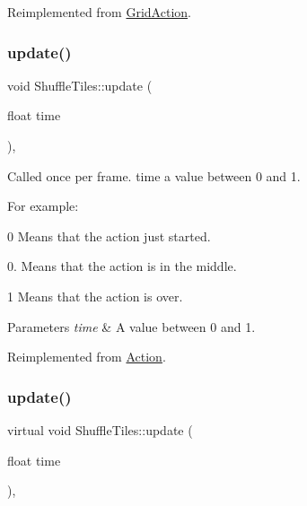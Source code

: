 Reimplemented from \hyperlink{classGridAction_a33e2c1bc95bbcf6b16428097b4fd4b61}{Grid\+Action}.

\mbox{\label{classShuffleTiles_a045829c657840301dc75208581fb5d94}} 
\subsubsection{\texorpdfstring{update()}{update()}\hspace{0.1cm}{\footnotesize\ttfamily [1/2]}}
{\footnotesize\ttfamily void Shuffle\+Tiles\+::update (\begin{DoxyParamCaption}\item[{float}]{time }\end{DoxyParamCaption})\hspace{0.3cm}{\ttfamily [override]}, {\ttfamily [virtual]}}

Called once per frame. time a value between 0 and 1.

For example\+:
\begin{DoxyItemize}
\item 0 Means that the action just started.
\item 0. Means that the action is in the middle.
\item 1 Means that the action is over.
\end{DoxyItemize}


\begin{DoxyParams}{Parameters}
{\em time} & A value between 0 and 1. \\
\hline
\end{DoxyParams}


Reimplemented from \hyperlink{classAction_a937e646e63915e33ad05ba149bfcf239}{Action}.

\mbox{\label{classShuffleTiles_a1f767f97531089a4ae73dd4c54741b01}} 
\subsubsection{\texorpdfstring{update()}{update()}\hspace{0.1cm}{\footnotesize\ttfamily [2/2]}}
{\footnotesize\ttfamily virtual void Shuffle\+Tiles\+::update (\begin{DoxyParamCaption}\item[{float}]{time }\end{DoxyParamCaption})\hspace{0.3cm}{\ttfamily [override]}, {\ttfamily [virtual]}}


